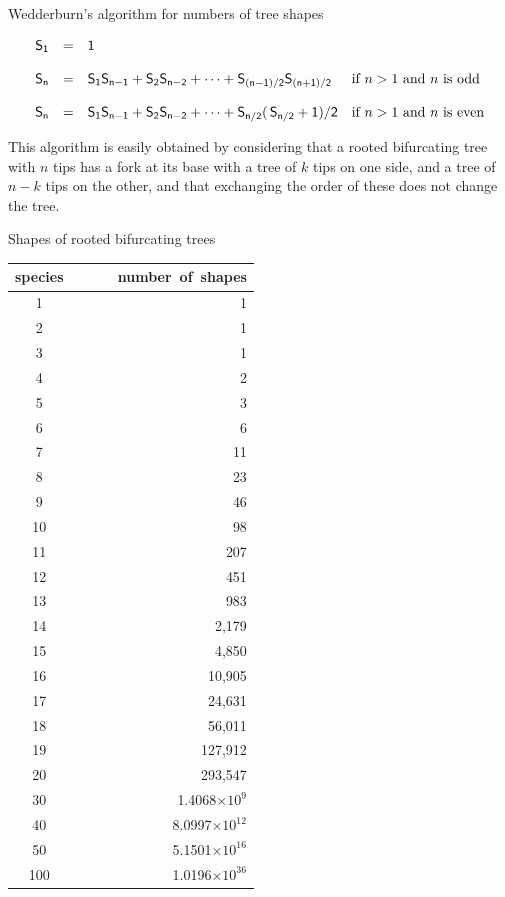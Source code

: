 \documentclass[bluish,slideColor,colorBG,pdf]{prosper}
\begin{document}
\begin{slide}[Replace]{Wedderburn's algorithm for numbers of tree shapes}
\bigskip

\[
\begin{array}{c c l l}
\mathsf{S_1} & \mathsf{=} & \mathsf{1} & \\
& & & \\
\mathsf{S_n} & \mathsf{=} & \mathsf{S_1 S_{n-1} + S_2 S_{n-2} + \dots + S_{(n-1)/2} S_{(n+1)/2}} & \mathsf{\mbox{if $n > 1$ and $n$ is odd}}\\
& & & \\
\mathsf{S_n} & \mathsf{=} & \mathsf{S_1 S_{n-1} + S_2 S_{n-2} + \dots + S_{n/2}(\,S_{n/2}+1)/2} & \mathsf{\mbox{if $n > 1$ and $n$ is even}}\\
\end{array}
\]

This algorithm is easily obtained by considering that a rooted bifurcating
tree with $n$ tips has a fork at its base with a tree of $k$ tips on one
side, and a tree of $n-k$ tips on the other, and that exchanging the
order of these does not change the tree.

\end{slide}

\begin{slide}[Replace]{Shapes of rooted bifurcating trees}

\vspace{-0.1in}
{
\begin{center}
\renewcommand{\arraystretch}{0.8}
\begin{tabular}{ c r }
\mbox{species}&\mbox{\ \ \ \ \ number of shapes} \\
\hline
1 & 1 \\
2 & 1 \\
3 & 1 \\
4 & 2 \\
5 & 3 \\
6 & 6 \\
7 & 11 \\
8 & 23 \\
9 & 46  \\
10 & 98  \\
11 & 207  \\
12 & 451  \\
13 & 983  \\
14 & 2,179  \\
15 & 4,850  \\
16 & 10,905  \\
17 & 24,631  \\
18 & 56,011  \\
19 & 127,912  \\
20 & 293,547 \\
30 & 1.4068$\times 10^9$\\
40 & 8.0997$\times 10^{12}$\\
50 & 5.1501$\times 10^{16}$\\
100 & \ \ \ \ \ \ \ \ \ \ 1.0196$\times 10^{36}$
\end{tabular}
\end{center}
}

\end{slide}
\end{document}
